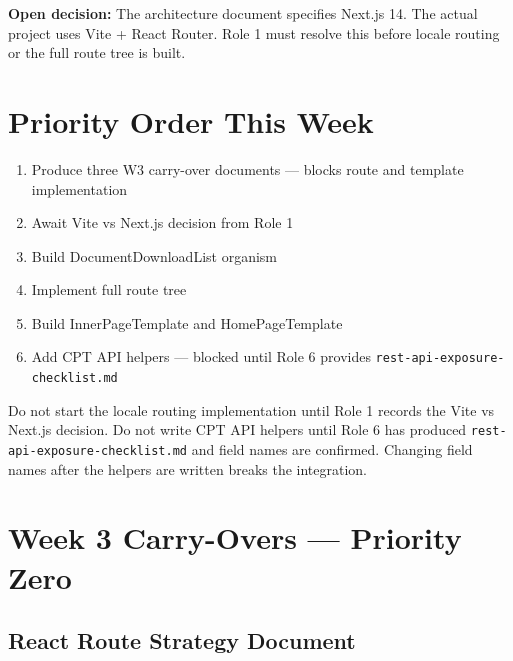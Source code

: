\documentclass[12pt,a4paper]{article}
\begin{document}
\begin{yellowbox}
\textbf{Open decision:} The architecture document specifies Next.js 14. The actual project
uses Vite + React Router. Role 1 must resolve this before locale routing or the full route
tree is built.
\end{yellowbox}

\section{Priority Order This Week}

\begin{enumerate}
    \item Produce three W3 carry-over documents --- blocks route and template implementation
    \item Await Vite vs Next.js decision from Role 1
    \item Build DocumentDownloadList organism
    \item Implement full route tree
    \item Build InnerPageTemplate and HomePageTemplate
    \item Add CPT API helpers --- blocked until Role 6 provides \texttt{rest-api-exposure-checklist.md}
\end{enumerate}

\begin{darkbox}
Do not start the locale routing implementation until Role 1 records the Vite vs Next.js
decision. Do not write CPT API helpers until Role 6 has produced
\texttt{rest-api-exposure-checklist.md} and field names are confirmed. Changing field names
after the helpers are written breaks the integration.
\end{darkbox}

\section{Week 3 Carry-Overs --- Priority Zero}

\subsection{React Route Strategy Document}
\end{document}
